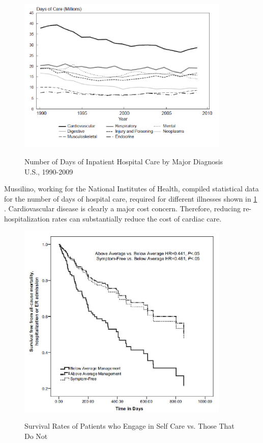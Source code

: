 \begin{figure}
	\begin{center}
		\label{fig:DaysofCare}
		\includegraphics[scale=1,width=0.9\textwidth]{Images/DaysOfCare.png} 
		\caption{Number of Days of Inpatient Hospital Care by Major Diagnosis U.S., 1990-2009 }
	\end{center}
\end{figure}

Mussilino, working for the National Institutes of Health, compiled statistical data for the number of days of hospital care, required for different illnesses shown in  \cref{fig:DaysofCare} \cite{Mussolino2012}. Cardiovascular disease is clearly a major cost concern. Therefore, reducing re-hospitalization rates can substantially reduce the cost of cardiac care.


\begin{figure}
	\begin{center}
		\label{fig:SurvivalRates}
		\includegraphics[scale=1,width=0.9\textwidth]{Images/SurvivalRate.jpg} 
		\caption{Survival Rates of Patients who Engage in Self Care vs. Those That Do Not}
	\end{center}
\end{figure}


